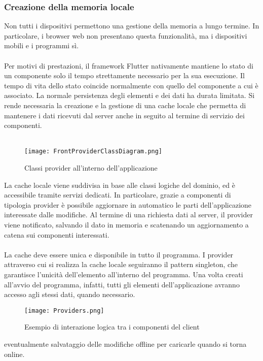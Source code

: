 \subsubsection{Creazione della memoria locale}
Non tutti i dispositivi permettono una gestione della memoria a lungo termine. 
In particolare, i browser web non presentano questa funzionalità, ma i dispositivi mobili e i programmi sì. \\
\\
Per motivi di prestazioni, il framework Flutter nativamente mantiene lo stato di un componente solo il tempo strettamente necessario per la sua esecuzione. 
Il tempo di vita dello stato coincide normalmente con quello del componente a cui è associato. 
La normale persistenza degli elementi e dei dati ha durata limitata. 
Si rende necessaria la creazione e la gestione di una cache locale che permetta di mantenere i dati ricevuti dal server anche in seguito al termine di servizio dei componenti.\\
\\
\begin{figure}[h!]
    \centering
    \texttt{[image: FrontProviderClassDiagram.png]}
    \caption{Classi provider all'interno dell'applicazione}
\end{figure}	
La cache locale viene suddivisa in base alle classi logiche del dominio, ed è accessibile tramite servizi dedicati. 
In particolare, grazie a componenti di tipologia provider è possibile aggiornare in automatico le parti dell’applicazione interessate dalle modifiche. 
Al termine di una richiesta dati al server, il provider viene notificato, salvando il dato in memoria e scatenando un aggiornamento a catena sui componenti interessati.\\
\\
La cache deve essere unica e disponibile in tutto il programma. 
I provider attraverso cui si realizza la cache locale seguiranno il pattern singleton, che garantisce l’unicità dell’elemento all’interno del programma. 
Una volta creati all’avvio del programma, infatti, tutti gli elementi dell’applicazione avranno accesso agli stessi dati, quando necessario.

\begin{figure}[h!]
    \centering
    \texttt{[image: Providers.png]}
    \caption{Esempio di interazione logica tra i componenti del client}
\end{figure}	

eventualmente salvataggio delle modifiche offline per caricarle quando si torna online. \\
\clearpage
